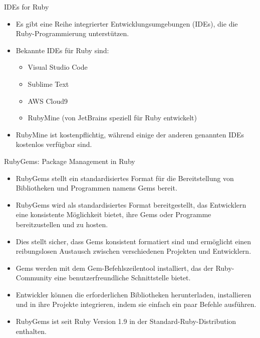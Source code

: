 \documentclass{beamer}
\begin{document}
\begin{frame}{IDEs for Ruby}
  \begin{itemize}
    \item Es gibt eine Reihe integrierter Entwicklungsumgebungen (IDEs), die die Ruby-Programmierung unterstützen.
    \item Bekannte IDEs für Ruby sind:
      \begin{itemize}
        \item Visual Studio Code
        \item Sublime Text
        \item AWS Cloud9
        \item RubyMine (von JetBrains speziell für Ruby entwickelt)
      \end{itemize}
    \item RubyMine ist kostenpflichtig, während einige der anderen genannten IDEs kostenlos verfügbar sind.
  \end{itemize}
\end{frame}
\begin{frame}{RubyGems: Package Management in Ruby}
  \begin{itemize}
    \item RubyGems stellt ein standardisiertes Format für die Bereitstellung von Bibliotheken und Programmen namens Gems bereit.
    \item RubyGems wird als standardisiertes Format bereitgestellt, das Entwicklern eine konsistente Möglichkeit bietet, ihre Gems oder Programme bereitzustellen und zu hosten.
    \item Dies stellt sicher, dass Gems konsistent formatiert sind und ermöglicht einen reibungslosen Austausch zwischen verschiedenen Projekten und Entwicklern.
    \item Gems werden mit dem Gem-Befehlszeilentool installiert, das der Ruby-Community eine benutzerfreundliche Schnittstelle bietet.
    \item Entwickler können die erforderlichen Bibliotheken herunterladen, installieren und in ihre Projekte integrieren, indem sie einfach ein paar Befehle ausführen.
    \item RubyGems ist seit Ruby Version 1.9 in der Standard-Ruby-Distribution enthalten.
  \end{itemize}
\end{frame}
\end{document}
